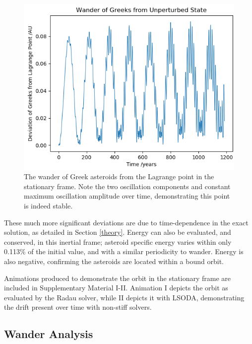 \documentclass[11pt, a4paper,twocolumn]{article} %
\begin{document}
\begin{figure}
	\centering
	\includegraphics[width=\linewidth]{Figures/greeks_deviation_stationary_frame}
	\caption{The wander of Greek asteroids from the Lagrange point in the stationary frame. Note the two oscillation components and constant maximum oscillation amplitude over time, demonstrating this point is indeed stable.}
	\label{fig:greeksdeviationstationaryframe}
\end{figure}

These much more significant deviations are due to time-dependence in the exact solution, as detailed in Section \ref{theory}. Energy can also be evaluated, and conserved, in this inertial frame; asteroid specific energy varies within only 0.113\% of the initial value, and with a similar periodicity to wander. Energy is also negative, confirming the asteroids are located within a bound orbit.

Animations produced to demonstrate the orbit in the stationary frame are included in Supplementary Material I-II. Animation I depicts the orbit as evaluated by the Radau solver, while II depicts it with LSODA, demonstrating the drift present over time with non-stiff solvers.

\subsection{Wander Analysis} \label{perturbed}
\end{document}
